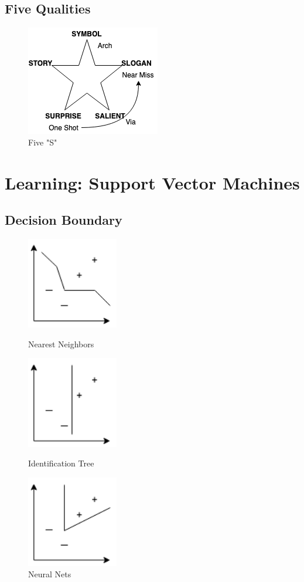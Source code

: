 \documentclass[12pt]{book}
\begin{document}
\subsection{Five Qualities}
\begin{figure}[ht]
	\centering
	\includegraphics[scale=0.5]{Figure/Figure15_3.png}
	\caption{Five "S"}
\end{figure}
\newpage
\section{Learning: Support Vector Machines}
\subsection{Decision Boundary}
\begin{figure}[htbp]
	\centering
	\begin{minipage}[t]{0.32\textwidth}
		\centering
		\includegraphics[height=4cm]{Figure/Figure16_1.png}
		\caption{Nearest Neighbors}
	\end{minipage}
	\begin{minipage}[t]{0.32\textwidth}
		\centering
		\includegraphics[height=4cm]{Figure/Figure16_2.png}
		\caption{Identification Tree}
	\end{minipage}
	\begin{minipage}[t]{0.32\textwidth}
		\centering
		\includegraphics[height=4cm]{Figure/Figure16_3.png}
		\caption{Neural Nets}
	\end{minipage}
\end{figure}
\end{document}
